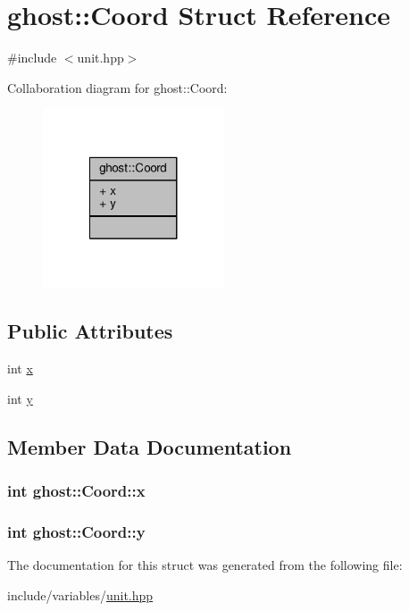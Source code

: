 \hypertarget{structghost_1_1Coord}{\section{ghost\-:\-:Coord Struct Reference}
\label{structghost_1_1Coord}
}


{\ttfamily \#include $<$unit.\-hpp$>$}



Collaboration diagram for ghost\-:\-:Coord\-:
\nopagebreak
\begin{figure}[H]
\begin{center}
\leavevmode
\includegraphics[width=152pt]{structghost_1_1Coord__coll__graph}
\end{center}
\end{figure}
\subsection*{Public Attributes}
\begin{DoxyCompactItemize}
\item 
int \hyperlink{structghost_1_1Coord_abe3b05082c73f30fe2cdbc4f7f95a66e}{x}
\item 
int \hyperlink{structghost_1_1Coord_a759ea460726dc146fd51cb35c33bcf21}{y}
\end{DoxyCompactItemize}


\subsection{Member Data Documentation}
\hypertarget{structghost_1_1Coord_abe3b05082c73f30fe2cdbc4f7f95a66e}{
\subsubsection[{x}]{\setlength{\rightskip}{0pt plus 5cm}int ghost\-::\-Coord\-::x}}\label{structghost_1_1Coord_abe3b05082c73f30fe2cdbc4f7f95a66e}
\hypertarget{structghost_1_1Coord_a759ea460726dc146fd51cb35c33bcf21}{
\subsubsection[{y}]{\setlength{\rightskip}{0pt plus 5cm}int ghost\-::\-Coord\-::y}}\label{structghost_1_1Coord_a759ea460726dc146fd51cb35c33bcf21}


The documentation for this struct was generated from the following file\-:\begin{DoxyCompactItemize}
\item 
include/variables/\hyperlink{unit_8hpp}{unit.\-hpp}\end{DoxyCompactItemize}
